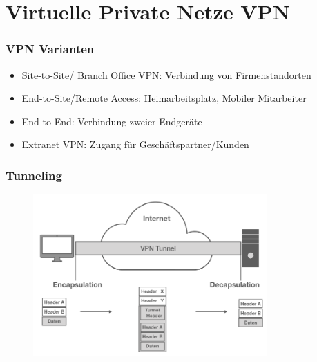 \documentclass[hyperref={pdfpagelabels=false},xcolor=dvipsnames]{beamer}
\newcommand*\mi{ \item[\color{gray}\scalebox{1.2}{\textbullet}]}
\begin{document}
\section{Virtuelle Private Netze VPN}
\frame{\sectionpage}


\begin{frame}
	\frametitle{VPN Varianten}
	\begin{itemize}
		\mi Site-to-Site/ Branch Office VPN: Verbindung von Firmenstandorten
		\mi End-to-Site/Remote Access: Heimarbeitsplatz, Mobiler Mitarbeiter
		\mi End-to-End: Verbindung zweier Endgeräte
		\mi Extranet VPN: Zugang für Geschäftspartner/Kunden	
	\end{itemize}

\end{frame}

\begin{frame}
	\frametitle{Tunneling}
	\begin{figure}
		\includegraphics[width=0.8\textwidth]{tunneling}	
	\end{figure}
\end{frame}
\end{document}

